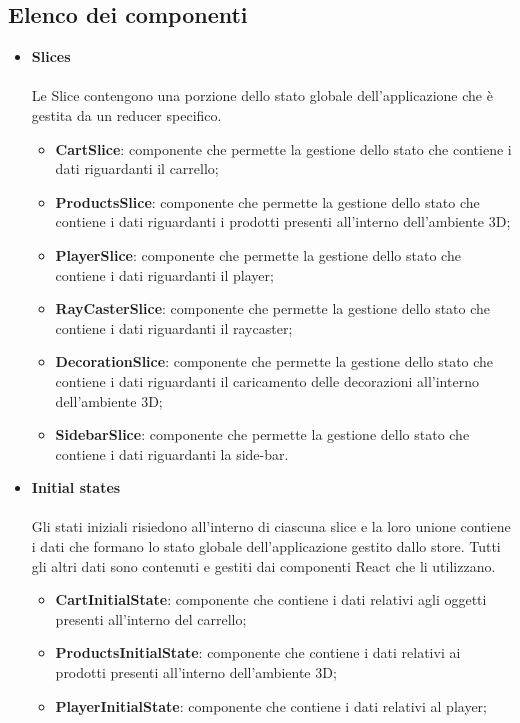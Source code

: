 \subsection{Elenco dei componenti}
\begin{itemize}
	\item \textbf{\large Slices}
	\\\\
	Le Slice contengono una porzione dello stato globale dell'applicazione che è gestita da un reducer specifico.
		\begin{itemize}
			\item \textbf{CartSlice}: componente che permette la gestione dello stato che contiene i dati riguardanti il carrello;
			\item \textbf{ProductsSlice}: componente che permette la gestione dello stato che contiene i dati riguardanti i prodotti 
			presenti all'interno dell'ambiente 3D;
			\item \textbf{PlayerSlice}: componente che permette la gestione dello stato che contiene i dati riguardanti il player;
			\item \textbf{RayCasterSlice}: componente che permette la gestione dello stato che contiene i dati riguardanti il
			raycaster;
			\item \textbf{DecorationSlice}: componente che permette la gestione dello stato che contiene i dati riguardanti
			il caricamento delle decorazioni all'interno dell'ambiente 3D;
			\item \textbf{SidebarSlice}: componente che permette la gestione dello stato che contiene i dati riguardanti
			la side-bar.
		\end{itemize}
	\item \textbf{\large Initial states}
	\\\\
	Gli stati iniziali risiedono all'interno di ciascuna slice e la loro unione contiene i dati che formano lo stato globale dell'applicazione gestito dallo store.
	Tutti gli altri dati sono contenuti e gestiti dai componenti React che li utilizzano.
		\begin{itemize}
			\item \textbf{CartInitialState}: componente che contiene i dati relativi agli oggetti presenti all'interno del carrello;
			\item \textbf{ProductsInitialState}: componente che contiene i dati relativi ai prodotti presenti all'interno dell'ambiente 3D;
			\item \textbf{PlayerInitialState}: componente che contiene i dati relativi al player;

\end{itemize}
\end{itemize}
